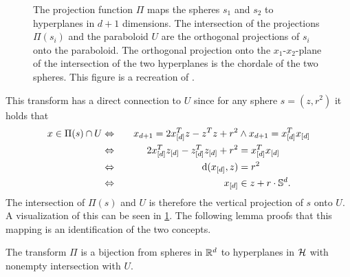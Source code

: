 \begin{figure}[tb]
    \caption{The projection function $\Pi$ maps the spheres $s_1$ and $s_2$ to hyperplanes in $d+1$ dimensions.
    The intersection of the projections $\Pi(s_i)$ and the paraboloid $U$ are the orthogonal projections of $s_i$ onto the paraboloid.
    The orthogonal projection onto the $x_1$-$x_2$-plane of the intersection of the two hyperplanes is the chordale of the two spheres.
    This figure is a recreation of .}
    \label{fig:projection}
\end{figure}
This transform has a direct connection to $U$ since for any sphere $s = (z, r^2)$ it holds that
\begin{alignat}{2}
    x \in \Pi(s) \cap U &\Leftrightarrow\quad& x_{d+1} = 2x_{[d]}^Tz - z^Tz + r^2 &\wedge x_{d+1} = x_{[d]}^Tx_{[d]}\\
    &\Leftrightarrow\quad&2x_{[d]}^Tz_{[d]} - z_{[d]}^Tz_{[d]} + r^2 &= x_{[d]}^Tx_{[d]}\\
    &\Leftrightarrow\quad& \operatorname{d}(x_{[d]}, z) &= r^2\\
    &\Leftrightarrow\quad& x_{[d]} &\in z + r \cdot \mathbb{S}^d.
\end{alignat}
The intersection of $\Pi(s)$ and $U$ is therefore the vertical projection of $s$ onto $U$.
A visualization of this can be seen in \cref{fig:projection}.
The following lemma proofs that this mapping is an identification of the two concepts.
\begin{lemma}
    \label{lem:pibijection}
    The transform $\Pi$ is a bijection from spheres in $\mathbb{R}^d$ to hyperplanes in $\mathcal{H}$ with nonempty intersection with $U$.
\end{lemma}
